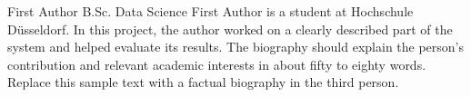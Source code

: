 \ResetPaperMetadata
{}
\PaperEmail{} %


\AddAuthor
  {First Author}
  {B.Sc. Data Science}
  {First Author is a student at Hochschule D\"usseldorf. In this project, the author worked on a clearly described part of the system and helped evaluate its results. The biography should explain the person's contribution and relevant academic interests in about fifty to eighty words. Replace this sample text with a factual biography in the third person.}
  {} %
  {} %
  {} %
  {} %

